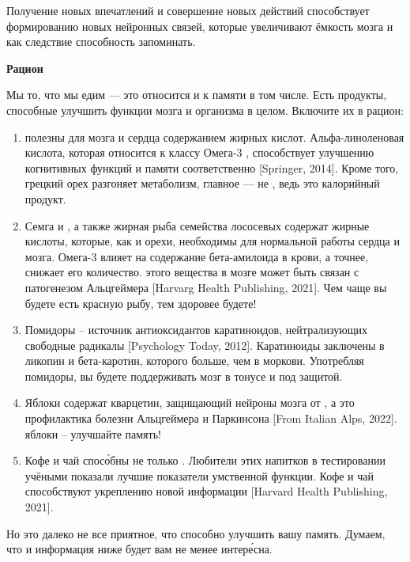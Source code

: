 Получение новых впечатлений и совершение новых действий способствует формированию новых нейронных связей, которые увеличивают ёмкость мозга и как следствие способность запоминать.

\textbf{Рацион}

Мы то, что мы едим --- это относится и к памяти в том числе. Есть продукты, способные улучшить функции мозга и организма в целом. Включите их в рацион:

\begin{enumerate}
    \item {} полезны для мозга и сердца содержанием жирных кислот. Альфа-линоленовая кислота, которая относится к классу Омега-3 , способствует улучшению когнитивных функций и памяти соответственно [Springer, 2014]. Кроме того, грецкий орех разгоняет метаболизм, главное --- не , ведь это калорийный продукт.
    \item Семга и , а также жирная рыба семейства лососевых содержат жирные кислоты, которые, как и орехи, необходимы для нормальной работы сердца и мозга. Омега-3 влияет на содержание бета-амилоида в крови, а точнее, снижает его количество.  этого вещества в мозге может быть связан с патогенезом Альцгеймера [Harvarg Health Publishing, 2021]. Чем чаще вы будете есть красную рыбу, тем здоровее будете!
    \item Помидоры – источник антиоксидантов каратиноидов, нейтрализующих свободные радикалы [Psychology Today, 2012]. Каратиноиды заключены в ликопин и бета-каротин, которого больше, чем в моркови. Употребляя помидоры, вы будете поддерживать мозг в тонусе и под защитой.
    \item Яблоки содержат кварцетин, защищающий нейроны мозга от , а это профилактика болезни Альцгеймера и Паркинсона [From Italian Alps, 2022].  яблоки – улучшайте память!
    \item Кофе и чай спос\'{о}бны не только . Любители этих напитков в тестировании учёными показали лучшие показатели умственной функции. Кофе и чай способствуют укреплению новой информации [Harvard Health Publishing, 2021].
\end{enumerate}

Но это далеко не все приятное, что способно улучшить вашу память. Думаем, что и информация ниже будет вам не менее интер\'{е}сна.

